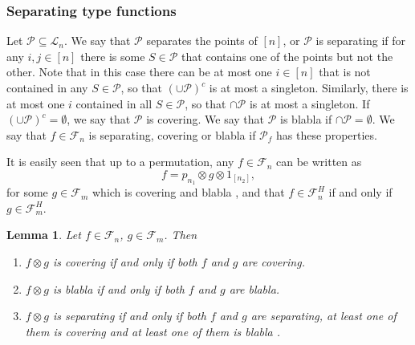 \documentclass[12pt]{article}
\newtheorem{lemma}{Lemma}
\theoremstyle{definition}
\theoremstyle{remark}
\def\blabla{blabla }
\def\Pe{\mathcal P}
\def\Fe{\mathcal F}
\begin{document}
\subsubsection{Separating type functions}



Let $\Pe\subseteq \mathcal L_n$. We say that $\Pe$ separates the points of $[n]$, or $\Pe$
is separating if for any
$i,j\in [n]$ there is some $S\in \Pe$ that contains one of the points but not the other. 
Note that in this case there can be at most one $i\in [n]$ that is not contained in any
$S\in \Pe$, so that $(\cup \Pe)^c$ is at most a singleton. Similarly, there is at most one
$i$ contained in all $S\in \Pe$, so that $\cap \Pe$ is at most a singleton. If $(\cup
\Pe)^c=\emptyset$, we say that $\Pe$ is covering.  We say that $\Pe$ is \blabla if $\cap
\Pe=\emptyset$.
We say that $f\in \Fe_n$ is
separating, covering or \blabla if $\Pe_f$ has these properties.

It is easily seen that up to a permutation, any $f\in \Fe_n$ can be written as
\[
f=p_{n_1}\otimes g\otimes 1_{[n_2]},
\]
for some $g\in \Fe_m$ which is covering and \blabla, and  that $f\in \Fe_n^H$ if and only if $g\in \Fe_m^H$. 

\begin{lemma}\label{lemma:cov_bla_sep}
Let $f\in \Fe_n$, $g\in \Fe_m$. Then
\begin{enumerate}
\item[(i)] $f\otimes g$ is covering if and only if both $f$ and $g$ are covering.
\item[(ii)] $f\otimes g$ is \blabla if and only if both $f$ and $g$ are blabla.
\item[(iii)] $f\otimes g$ is separating if and only if both $f$ and $g$ are separating,
at least one  of them is covering and at least one of them is \blabla. 

\end{enumerate}



\end{lemma}
\end{document}
